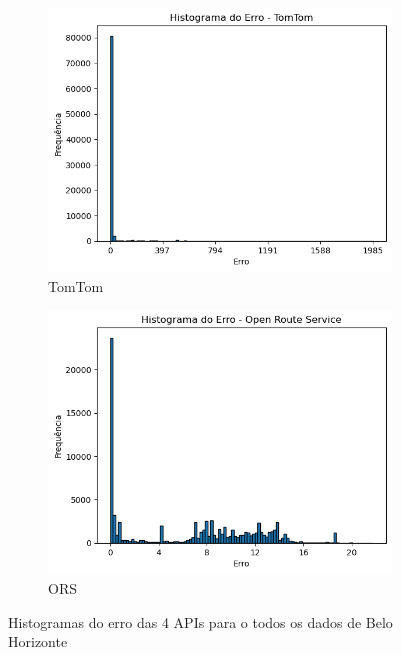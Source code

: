 \begin{figure}[ht]
  \begin{subfigure}[b]{0.45\textwidth}
    \includegraphics[width=\textwidth]{Figuras/histTomtomBH.png}
    \caption{TomTom}
    \label{fig:histtomtomB}
  \end{subfigure}
  \hfill
  \begin{subfigure}[b]{0.45\textwidth}
    \includegraphics[width=\textwidth]{Figuras/histOrsBH.png}
    \caption{ORS}
    \label{fig:historsB}
  \end{subfigure}
  
  \caption{Histogramas do erro das 4 APIs para o todos os dados de Belo Horizonte}
  \label{fig:hist-global-bh}
\end{figure}


